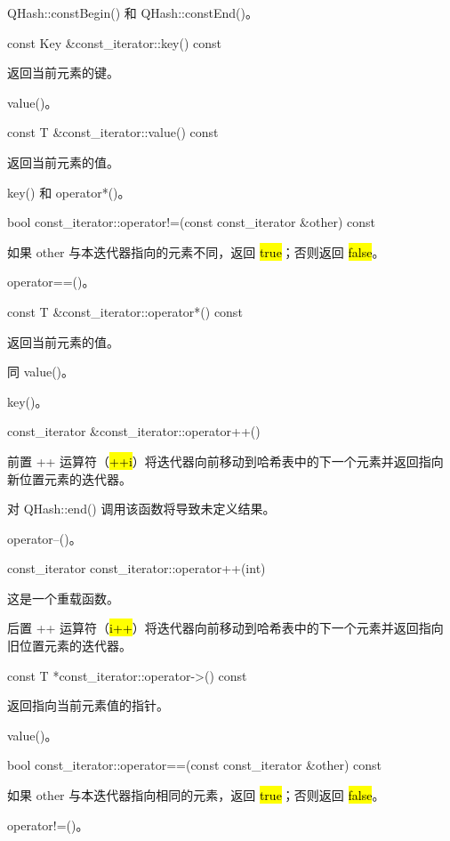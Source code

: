 \begin{notice}[另请参阅]
QHash::constBegin() 和 QHash::constEnd()。
\end{notice}


const Key \&const\_iterator::key() const

返回当前元素的键。



\begin{notice}[另请参阅]
 value()。
\end{notice}

const T \&const\_iterator::value() const

返回当前元素的值。



\begin{notice}[另请参阅]
 key() 和 operator*()。
\end{notice}

bool const\_iterator::operator!=(const const\_iterator \&other) const

如果 other 与本迭代器指向的元素不同，返回 \hl{true}；否则返回 \hl{false}。


\begin{notice}[另请参阅]
operator==()。
\end{notice}

const T \&const\_iterator::operator*() const

返回当前元素的值。

同 value()。

\begin{notice}[另请参阅]
key()。
\end{notice}


const\_iterator \&const\_iterator::operator++()

前置 ++ 运算符（\hl{++i}）将迭代器向前移动到哈希表中的下一个元素并返回指向新位置元素的迭代器。

对 QHash::end() 调用该函数将导致未定义结果。

\begin{notice}[另请参阅]
operator--()。
\end{notice}

const\_iterator const\_iterator::operator++(int)

这是一个重载函数。

后置 ++ 运算符（\hl{i++}）将迭代器向前移动到哈希表中的下一个元素并返回指向
旧位置元素的迭代器。

const T *const\_iterator::operator->() const

返回指向当前元素值的指针。

\begin{notice}[另请参阅]
value()。
\end{notice}

bool const\_iterator::operator==(const const\_iterator \&other) const

如果 other 与本迭代器指向相同的元素，返回 \hl{true}；否则返回 \hl{false}。



\begin{notice}[另请参阅]
operator!=()。
\end{notice}


